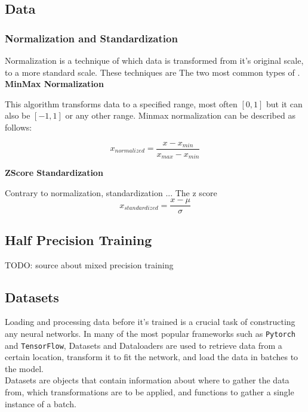 \subsection{Data}
\label{back:data}

\subsubsection{Normalization and Standardization}

Normalization is a technique of which data is transformed from it's original scale, to a more standard scale. These techniques are 
The two most common types of . \\

\textbf{MinMax Normalization}

This algorithm transforms data to a specified range, most often $[0, 1]$ but it can also be $[-1, 1]$ or any other range.
Minmax normalization can be described as follows:

\begin{equation}
   x_{normalized} = \dfrac{x - x_{min}}{x_{max}-x_{min}}
\end{equation}

\textbf{ZScore Standardization}

Contrary to normalization, standardization ...
The z score 
\begin{equation}
   x_{standardized} = \dfrac{x - \mu}{\sigma}
\end{equation}

\subsection{Half Precision Training}


TODO: source about mixed precision training

\subsection{Datasets}

Loading and processing data before it's trained is a crucial task of constructing any neural networks. In many of the most popular frameworks such as \texttt{Pytorch} and \texttt{TensorFlow}, Datasets and Dataloaders are used to retrieve data from a certain location, transform it to fit the network, and load the data in batches to the model. \\

Datasets are objects that contain information about where to gather the data from, which transformations are to be applied, and functions to gather a single instance of a batch.

